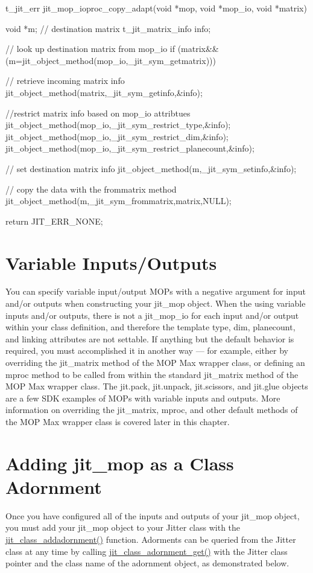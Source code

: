 \begin{DoxyCode}
t_jit_err jit_mop_ioproc_copy_adapt(void *mop, void *mop_io, void *matrix)
{
   void *m; // destination matrix
   t_jit_matrix_info info;
   
   // look up destination matrix from mop_io
   if (matrix&&(m=jit_object_method(mop_io,_jit_sym_getmatrix))) 
   {
      // retrieve incoming matrix info
      jit_object_method(matrix,_jit_sym_getinfo,&info);

      //restrict matrix info based on mop_io attribtues
      jit_object_method(mop_io,_jit_sym_restrict_type,&info);
      jit_object_method(mop_io,_jit_sym_restrict_dim,&info);
      jit_object_method(mop_io,_jit_sym_restrict_planecount,&info);

      // set destination matrix info
      jit_object_method(m,_jit_sym_setinfo,&info);

      // copy the data with the frommatrix method
      jit_object_method(m,_jit_sym_frommatrix,matrix,NULL);
   }

   return JIT_ERR_NONE;
}
\end{DoxyCode}
\hypertarget{chapter_jit_mopdetails_chapter_jit_mopdetails_vario}{}\section{Variable Inputs/Outputs}\label{chapter_jit_mopdetails_chapter_jit_mopdetails_vario}
You can specify variable input/output MOPs with a negative argument for input and/or outputs when constructing your jit\_\-mop object. When the using variable inputs and/or outputs, there is not a jit\_\-mop\_\-io for each input and/or output within your class definition, and therefore the template type, dim, planecount, and linking attributes are not settable. If anything but the default behavior is required, you must accomplished it in another way — for example, either by overriding the jit\_\-matrix method of the MOP Max wrapper class, or defining an mproc method to be called from within the standard jit\_\-matrix method of the MOP Max wrapper class. The jit.pack, jit.unpack, jit.scissors, and jit.glue objects are a few SDK examples of MOPs with variable inputs and outputs. More information on overriding the jit\_\-matrix, mproc, and other default methods of the MOP Max wrapper class is covered later in this chapter.\hypertarget{chapter_jit_mopdetails_chapter_jit_mopdetails_adorn}{}\section{Adding jit\_\-mop as a Class Adornment}\label{chapter_jit_mopdetails_chapter_jit_mopdetails_adorn}
Once you have configured all of the inputs and outputs of your jit\_\-mop object, you must add your jit\_\-mop object to your Jitter class with the \hyperlink{group__classmod_ga408738c800435bf50d092ce52b223327}{jit\_\-class\_\-addadornment()} function. Adorments can be queried from the Jitter class at any time by calling \hyperlink{group__classmod_ga1b040b25876a0905f60683413ce34ae6}{jit\_\-class\_\-adornment\_\-get()} with the Jitter class pointer and the class name of the adornment object, as demonstrated below.


